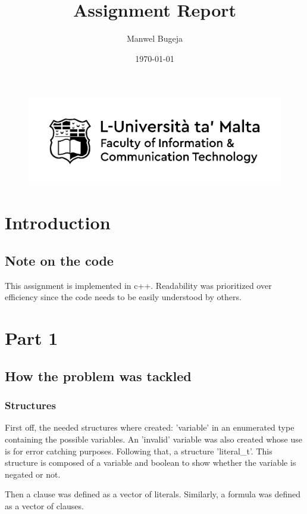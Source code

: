 \documentclass[a4paper, 12pt]{article}
\begin{document}
\begin{figure}
    \centering
    \includegraphics[width=1\textwidth]{Logo}
\end{figure}

\title{Assignment Report}
\author{Manwel Bugeja}
\date{\today}
\maketitle

\tableofcontents
\newpage

\section{Introduction}
\subsection{Note on the code}
This assignment is implemented in c++. Readability was prioritized over efficiency since the code needs to be
easily understood by others. 

\section{Part 1}
\subsection{How the problem was tackled}
\subsubsection{Structures}
First off, the needed structures where created: 'variable' in an enumerated type containing the possible variables.
An 'invalid' variable was also created whose use is for error catching purposes. Following that, a structure 'literal\_t'.
This structure is composed of a variable and boolean to show whether the variable is negated or not.

Then a clause was defined as a vector of literals. Similarly, a formula was defined as a vector of clauses.
\end{document}
